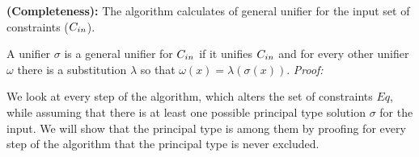 \begin{theorem}\label{theo:unifyCompleteness}
  \textbf{(Completeness):} The \unify{} algorithm calculates  of general unifier for the input set of constraints ($C_{in}$).
\end{theorem}
A unifier $\sigma$ is a general unifier for $C_{in}$ if it unifies $C_{in}$
and for every other unifier $\omega$ there is a substitution $\lambda$ so that $\omega(x) = \lambda(\sigma(x))$.
\textit{Proof:}

We look at every step of the algorithm, which alters the set of constraints $Eq$,
while assuming that there is at least one possible principal type solution $\sigma$ for the input.
We will show that the principal type is among them by proofing for every step of the algorithm that the principal type is never excluded.


